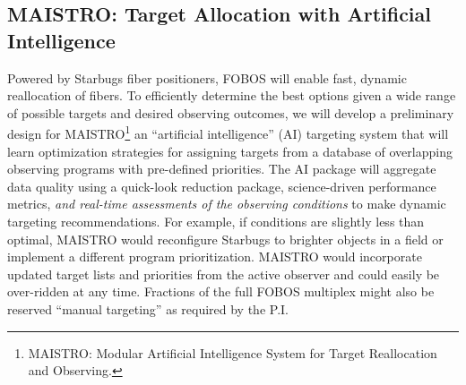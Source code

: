 \documentclass[oneside,11pt]{amsart}
\newcommand{\comment}[2][todo]{{\color{#1}[[{\bf #2}]]}}
\begin{document}





\subsection{MAISTRO: Target Allocation with Artificial Intelligence}
\label{sec:targeting}

Powered by Starbugs fiber positioners, FOBOS will enable fast, dynamic reallocation of fibers.  To efficiently
determine the best options given a wide range of possible targets and desired observing outcomes, we will develop a
preliminary design for MAISTRO\footnote{MAISTRO: Modular Artificial Intelligence System for Target Reallocation and
Observing.} an ``artificial intelligence'' (AI) targeting system that will learn optimization strategies for assigning
targets from a database of overlapping observing programs with pre-defined priorities.  The AI package will aggregate
data quality using a quick-look reduction package, science-driven performance metrics, {\it and real-time assessments
of the observing conditions} to make dynamic targeting recommendations.  For example, if conditions are
slightly less than optimal, MAISTRO would reconfigure Starbugs to brighter objects in a field or implement a different program prioritization.  MAISTRO would incorporate updated target lists and priorities from the active observer and could easily be over-ridden at any time.   Fractions of the full FOBOS multiplex might also be reserved ``manual targeting'' as required by the P.I.  

\end{document}
